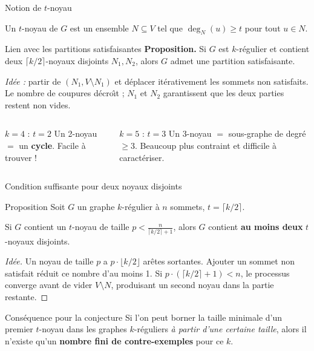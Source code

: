 \begin{frame}{Notion de $t$-noyau}
  \begin{definition}[$t$-noyau]
    Un $t$-noyau de $G$ est un ensemble $N \subseteq V$ tel que $\deg_N(u) \geq t$ pour tout $u \in N$.
  \end{definition}

  \medskip

  \begin{block}{Lien avec les partitions satisfaisantes}
    \textbf{Proposition.} Si $G$ est $k$-r\'egulier et contient deux $\lceil k/2 \rceil$-noyaux disjoints $N_1, N_2$, alors $G$ admet une partition satisfaisante.

    \smallskip
    \textit{Id\'ee :} partir de $(N_1, V \!\setminus\! N_1)$ et d\'eplacer it\'erativement les sommets non satisfaits. Le nombre de coupures d\'ecro\^{\i}t ; $N_1$ et $N_2$ garantissent que les deux parties restent non vides.
  \end{block}

  \bigskip

  \begin{columns}[T]
    \begin{exampleblock}{$k = 4$ : $t = 2$}
      Un 2-noyau $=$ un \textbf{cycle}. Facile \`a trouver !
    \end{exampleblock}

    \begin{alertblock}{$k = 5$ : $t = 3$}
      Un 3-noyau $=$ sous-graphe de degr\'e $\geq 3$. Beaucoup plus contraint et difficile \`a caract\'eriser.
    \end{alertblock}
  \end{columns}
\end{frame}

\begin{frame}{Condition suffisante pour deux noyaux disjoints}
  \begin{block}{Proposition}
    Soit $G$ un graphe $k$-r\'egulier \`a $n$ sommets, $t = \lceil k/2 \rceil$.

    Si $G$ contient un $t$-noyau de taille $\displaystyle p < \frac{n}{\lceil k/2 \rceil + 1}$,
    alors $G$ contient \textbf{au moins deux} $t$-noyaux disjoints.
  \end{block}

  \begin{proof}[Id\'ee]
    Un noyau de taille $p$ a $p \cdot \lfloor k/2 \rfloor$ ar\^etes sortantes.
    Ajouter un sommet non satisfait r\'eduit ce nombre d'au moins 1.
    Si $p \cdot (\lceil k/2 \rceil + 1) < n$, le processus converge avant de vider $V \setminus N$, produisant un second noyau dans la partie restante.
  \end{proof}

  \medskip
  \begin{alertblock}{Cons\'equence pour la conjecture}
    Si l'on peut borner la taille minimale d'un premier $t$-noyau dans les graphes $k$-r\'eguliers \emph{\`a partir d'une certaine taille}, alors il n'existe qu'un \textbf{nombre fini de contre-exemples} pour ce $k$.
  \end{alertblock}
\end{frame}

